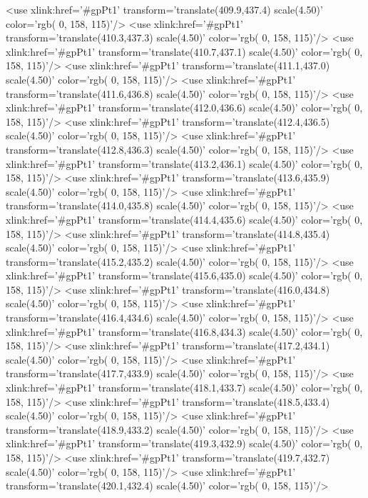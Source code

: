 	<use xlink:href='#gpPt1' transform='translate(409.9,437.4) scale(4.50)' color='rgb(  0, 158, 115)'/>
	<use xlink:href='#gpPt1' transform='translate(410.3,437.3) scale(4.50)' color='rgb(  0, 158, 115)'/>
	<use xlink:href='#gpPt1' transform='translate(410.7,437.1) scale(4.50)' color='rgb(  0, 158, 115)'/>
	<use xlink:href='#gpPt1' transform='translate(411.1,437.0) scale(4.50)' color='rgb(  0, 158, 115)'/>
	<use xlink:href='#gpPt1' transform='translate(411.6,436.8) scale(4.50)' color='rgb(  0, 158, 115)'/>
	<use xlink:href='#gpPt1' transform='translate(412.0,436.6) scale(4.50)' color='rgb(  0, 158, 115)'/>
	<use xlink:href='#gpPt1' transform='translate(412.4,436.5) scale(4.50)' color='rgb(  0, 158, 115)'/>
	<use xlink:href='#gpPt1' transform='translate(412.8,436.3) scale(4.50)' color='rgb(  0, 158, 115)'/>
	<use xlink:href='#gpPt1' transform='translate(413.2,436.1) scale(4.50)' color='rgb(  0, 158, 115)'/>
	<use xlink:href='#gpPt1' transform='translate(413.6,435.9) scale(4.50)' color='rgb(  0, 158, 115)'/>
	<use xlink:href='#gpPt1' transform='translate(414.0,435.8) scale(4.50)' color='rgb(  0, 158, 115)'/>
	<use xlink:href='#gpPt1' transform='translate(414.4,435.6) scale(4.50)' color='rgb(  0, 158, 115)'/>
	<use xlink:href='#gpPt1' transform='translate(414.8,435.4) scale(4.50)' color='rgb(  0, 158, 115)'/>
	<use xlink:href='#gpPt1' transform='translate(415.2,435.2) scale(4.50)' color='rgb(  0, 158, 115)'/>
	<use xlink:href='#gpPt1' transform='translate(415.6,435.0) scale(4.50)' color='rgb(  0, 158, 115)'/>
	<use xlink:href='#gpPt1' transform='translate(416.0,434.8) scale(4.50)' color='rgb(  0, 158, 115)'/>
	<use xlink:href='#gpPt1' transform='translate(416.4,434.6) scale(4.50)' color='rgb(  0, 158, 115)'/>
	<use xlink:href='#gpPt1' transform='translate(416.8,434.3) scale(4.50)' color='rgb(  0, 158, 115)'/>
	<use xlink:href='#gpPt1' transform='translate(417.2,434.1) scale(4.50)' color='rgb(  0, 158, 115)'/>
	<use xlink:href='#gpPt1' transform='translate(417.7,433.9) scale(4.50)' color='rgb(  0, 158, 115)'/>
	<use xlink:href='#gpPt1' transform='translate(418.1,433.7) scale(4.50)' color='rgb(  0, 158, 115)'/>
	<use xlink:href='#gpPt1' transform='translate(418.5,433.4) scale(4.50)' color='rgb(  0, 158, 115)'/>
	<use xlink:href='#gpPt1' transform='translate(418.9,433.2) scale(4.50)' color='rgb(  0, 158, 115)'/>
	<use xlink:href='#gpPt1' transform='translate(419.3,432.9) scale(4.50)' color='rgb(  0, 158, 115)'/>
	<use xlink:href='#gpPt1' transform='translate(419.7,432.7) scale(4.50)' color='rgb(  0, 158, 115)'/>
	<use xlink:href='#gpPt1' transform='translate(420.1,432.4) scale(4.50)' color='rgb(  0, 158, 115)'/>
